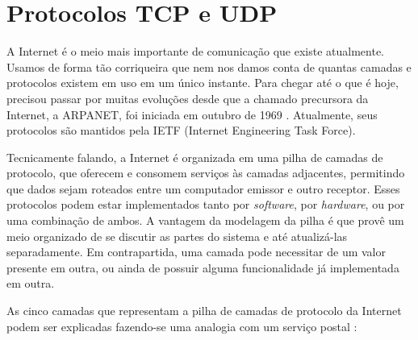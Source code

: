 
\section{Protocolos TCP e UDP}

A Internet é o meio mais importante de comunicação que existe atualmente. Usamos de
forma tão corriqueira que nem nos damos conta de quantas camadas e protocolos existem em
uso em um único instante. Para chegar até o que é hoje, precisou passar por muitas
evoluções desde que a chamado precursora da Internet, a ARPANET, foi iniciada em outubro
de 1969 \cite{book:kurose}. Atualmente, seus protocolos são mantidos pela IETF
(Internet Engineering Task Force).

Tecnicamente falando, a Internet é organizada em uma pilha de camadas de protocolo, que
oferecem e consomem serviços às camadas adjacentes, permitindo que dados sejam roteados
entre um computador emissor e outro receptor. Esses protocolos podem estar implementados
tanto por \emph{software}, por \emph{hardware}, ou por uma combinação de ambos. A
vantagem da modelagem da pilha é que provê um meio organizado de se discutir as partes
do sistema e até atualizá-las separadamente. Em contrapartida, uma camada pode
necessitar de um valor presente em outra, ou ainda de possuir alguma funcionalidade já
implementada em outra.

As cinco camadas que representam a pilha de camadas de protocolo da Internet podem ser
explicadas fazendo-se uma analogia com um serviço postal \cite{site:internet-layer}:


